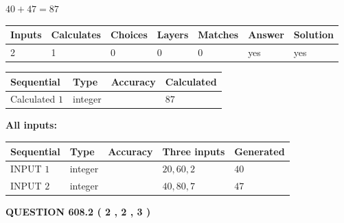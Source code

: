 \documentclass[12pt]{article}
\begin{document}
 

$ %
40 +  %
47=   %
87$
 
 
\noindent{}
 
 

 
   
   
   
   
\noindent\begin{tabular}{|l|l|l|l|l|l|l|}
 \hline
Inputs & Calculates & Choices & Layers & Matches & Answer & Solution \\ \hline
 2  & 
 1  & 
 0
  & 
 0  & 
 0  & 
  yes & 
  yes 
  \\ \hline
 \end{tabular}
   
   
   
   
\noindent{}
   
   
  
  
\noindent\begin{tabular}{|l|l|l|l|}
\hline
 Sequential & Type & Accuracy & Calculated \\ 
\hline
 
 
  Calculated $  1 $ & integer &  & 
  $ 87 $ 
 \\  \hline  
 \end{tabular}
   
   
   
   
\noindent\vspace{0.1in}\hspace{-0.08in} {\textbf{\Large{All inputs: }}}
   
   
  
  
\noindent\begin{tabular}{|l|l|l|l|l|}
\hline
 Sequential & Type & Accuracy & Three inputs & Generated \\ 
\hline
 
 
  INPUT $  1 $ & integer &  & $
 20
 , 
 60
 , 
 2
 $ & $ 40 $ 
 \\  \hline  
 
 
  INPUT $  2 $ & integer &  & $
 40
 , 
 80
 , 
 7
 $ & $ 47 $ 
 \\  \hline  
 \end{tabular}
   
   
  
\vspace{0.2in}
  
{\textbf{\Large{QUESTION
608.2 
 ( 2 , 2 , 3 )
}}}
  
\end{document}
